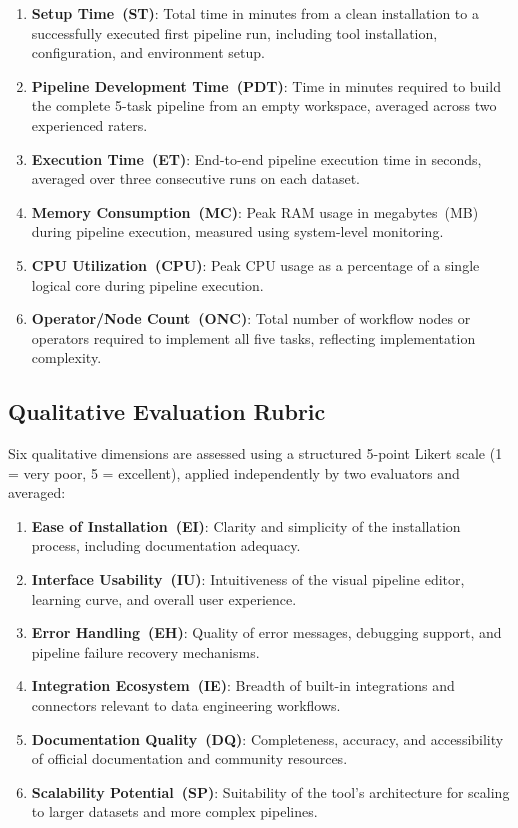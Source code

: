 \documentclass[journal]{IEEEtran}
\begin{document}
\begin{enumerate}
  \item \textbf{Setup Time~(ST)}: Total time in minutes from a clean
        installation to a successfully executed first pipeline run,
        including tool installation, configuration, and environment setup.
  \item \textbf{Pipeline Development Time~(PDT)}: Time in minutes required
        to build the complete 5-task pipeline from an empty workspace,
        averaged across two experienced raters.
  \item \textbf{Execution Time~(ET)}: End-to-end pipeline execution time
        in seconds, averaged over three consecutive runs on each dataset.
  \item \textbf{Memory Consumption~(MC)}: Peak RAM usage in megabytes~(MB)
        during pipeline execution, measured using system-level monitoring.
  \item \textbf{CPU Utilization~(CPU)}: Peak CPU usage as a percentage of
        a single logical core during pipeline execution.
  \item \textbf{Operator/Node Count~(ONC)}: Total number of workflow
        nodes or operators required to implement all five tasks, reflecting
        implementation complexity.
\end{enumerate}

\subsection{Qualitative Evaluation Rubric}

Six qualitative dimensions are assessed using a structured 5-point Likert
scale (1 = very poor, 5 = excellent), applied independently by two
evaluators and averaged:

\begin{enumerate}
  \item \textbf{Ease of Installation~(EI)}: Clarity and simplicity of
        the installation process, including documentation adequacy.
  \item \textbf{Interface Usability~(IU)}: Intuitiveness of the visual
        pipeline editor, learning curve, and overall user experience.
  \item \textbf{Error Handling~(EH)}: Quality of error messages,
        debugging support, and pipeline failure recovery mechanisms.
  \item \textbf{Integration Ecosystem~(IE)}: Breadth of built-in
        integrations and connectors relevant to data engineering workflows.
  \item \textbf{Documentation Quality~(DQ)}: Completeness, accuracy, and
        accessibility of official documentation and community resources.
  \item \textbf{Scalability Potential~(SP)}: Suitability of the tool's
        architecture for scaling to larger datasets and more complex pipelines.
\end{enumerate}
\end{document}
